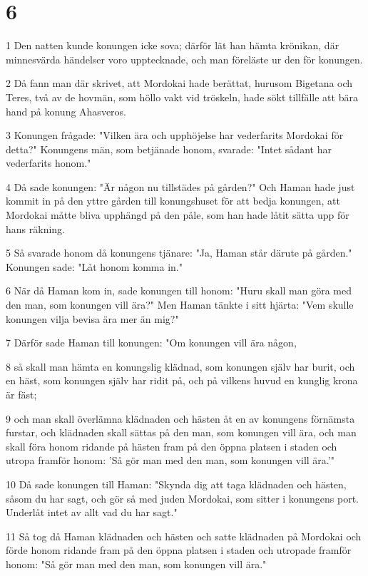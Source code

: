 \chapter{6}

\par 1 Den natten kunde konungen icke sova; därför lät han hämta krönikan, där minnesvärda händelser voro upptecknade, och man föreläste ur den för konungen.
\par 2 Då fann man där skrivet, att Mordokai hade berättat, hurusom Bigetana och Teres, två av de hovmän, som höllo vakt vid tröskeln, hade sökt tillfälle att bära hand på konung Ahasveros.
\par 3 Konungen frågade: "Vilken ära och upphöjelse har vederfarits Mordokai för detta?" Konungens män, som betjänade honom, svarade: "Intet sådant har vederfarits honom."
\par 4 Då sade konungen: "Är någon nu tillstädes på gården?" Och Haman hade just kommit in på den yttre gården till konungshuset för att bedja konungen, att Mordokai måtte bliva upphängd på den påle, som han hade låtit sätta upp för hans räkning.
\par 5 Så svarade honom då konungens tjänare: "Ja, Haman står därute på gården." Konungen sade: "Låt honom komma in."
\par 6 När då Haman kom in, sade konungen till honom: "Huru skall man göra med den man, som konungen vill ära?" Men Haman tänkte i sitt hjärta: "Vem skulle konungen vilja bevisa ära mer än mig?"
\par 7 Därför sade Haman till konungen: "Om konungen vill ära någon,
\par 8 så skall man hämta en konungslig klädnad, som konungen själv har burit, och en häst, som konungen själv har ridit på, och på vilkens huvud en kunglig krona är fäst;
\par 9 och man skall överlämna klädnaden och hästen åt en av konungens förnämsta furstar, och klädnaden skall sättas på den man, som konungen vill ära, och man skall föra honom ridande på hästen fram på den öppna platsen i staden och utropa framför honom: 'Så gör man med den man, som konungen vill ära.'"
\par 10 Då sade konungen till Haman: "Skynda dig att taga klädnaden och hästen, såsom du har sagt, och gör så med juden Mordokai, som sitter i konungens port. Underlåt intet av allt vad du har sagt."
\par 11 Så tog då Haman klädnaden och hästen och satte klädnaden på Mordokai och förde honom ridande fram på den öppna platsen i staden och utropade framför honom: "Så gör man med den man, som konungen vill ära."
